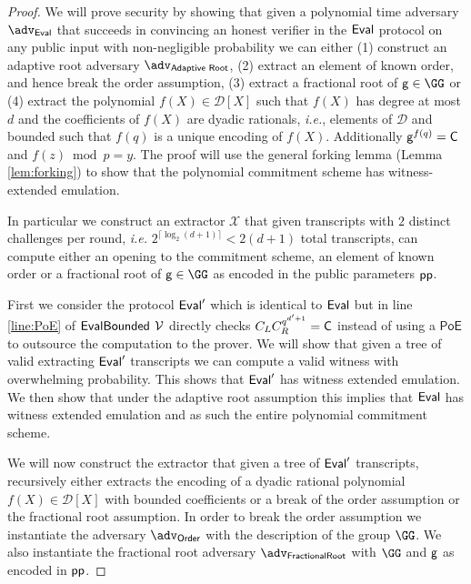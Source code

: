 \documentclass{article}
\theoremstyle{definition}
\begin{document}
\begin{proof}
We will prove security by showing that given a polynomial time adversary $\adv_{\eval}$ that succeeds in convincing an honest verifier in the $\textsf{{Eval}}$ protocol on any public input with non-negligible probability we can either (1) construct an adaptive root adversary $\adv_{\textsf{Adaptive Root}}$, (2) extract an element of known order, and hence break the order assumption, (3) extract a fractional root of $\gr{g}\in \GG$ or (4) extract the polynomial $f(X)\in \mathcal{D}[X]$ such that $f(X)$ has degree at most $d$ and the coefficients of $f(X)$ are dyadic rationals, \emph{i.e.}, elements of $\mathcal{D}$ and bounded such that $f(q)$ is a unique encoding of $f(X)$. Additionally $\mathsf{g}^{f(q)}=\mathsf{C}$ and $f(z) \bmod p=y$. The proof will use the general forking lemma (Lemma \ref{lem:forking}) to show that the polynomial commitment scheme has witness-extended emulation.

In particular we construct an extractor $\mathcal{X}$ that given transcripts with $2$ distinct challenges per round, \emph{i.e.} $2^{\lceil\log_2(d+1)\rceil}<2 (d+1)$ total transcripts, can compute either an opening to the commitment scheme, an element of known order or a fractional root of $\gr{g}\in\GG$ as encoded in the public parameters $\textsf{pp}$.

First we consider the protocol $\textsf{{Eval}}'$ which is identical to $\textsf{{Eval}}$ but in line \ref{line:PoE} of $\textsf{{EvalBounded}}$ $\mathcal{V}$ directly checks $C_LC_R^{q^{d'+1}}=\mathsf{C}$ instead of using a $\textsf{PoE}$ to outsource the computation to the prover. We will show that given a tree of valid extracting $\textsf{{Eval}}'$ transcripts we can compute a valid witness with overwhelming probability. This shows that $\textsf{{Eval}}'$ has witness extended emulation. We then show that under the adaptive root assumption this implies that $\textsf{{Eval}}$ has witness extended emulation and as such the entire polynomial commitment scheme.


We will now construct the extractor that given a tree of $\textsf{{Eval}}'$ transcripts, recursively either extracts the encoding of a dyadic rational polynomial $f(X)\in \mathcal{D}[X]$ with bounded coefficients or a break of the order assumption or the fractional root assumption. In order to break the order assumption we instantiate the adversary $\adv_{\textsf{Order}}$ with the description of the group $\GG$. We also instantiate the fractional root adversary $\adv_{\textsf{FractionalRoot}}$ with $\GG$ and $\mathsf{g}$ as encoded in $\textsf{pp}$.


\end{proof}
\end{document}
